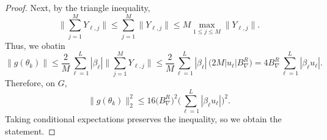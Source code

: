 \documentclass[10pt,a4paper]{amsart}
\newcommand\cG{\mathcal G}
\begin{document}
\begin{proof}
Next, by the triangle inequality,
\[
\Big\|\sum_{j=1}^M Y_{\ell,j}\Big\|
\le \sum_{j=1}^M \|Y_{\ell,j}\|
\le M \max_{1\le j\le M}\|Y_{\ell,j}\|.
\]
Thus, we obatin
\[
\|g(\theta_k)\|
\le \frac{2}{M}\sum_{\ell=1}^{L}|\beta_\ell|
\Big\|\sum_{j=1}^M Y_{\ell,j}\Big\|
\le \frac{2}{M}\sum_{\ell=1}^{L}|\beta_\ell|\,
\Big(2M|u_\ell|B_\nabla^R\Big)
=4B_\nabla^R\sum_{\ell=1}^{L}|\beta_\ell u_\ell|.
\]
Therefore, on $G$,
\begin{equation}\label{eq:g-det-bound}
\|g(\theta_k)\|_2^2
\le 16\big(B_\nabla^R\big)^2
\Big(\sum_{\ell=1}^{L}|\beta_\ell u_\ell|\Big)^2.
\end{equation}
Taking conditional expectations preserves the inequality, so we obtain the statement.
\end{proof}
\end{document}
